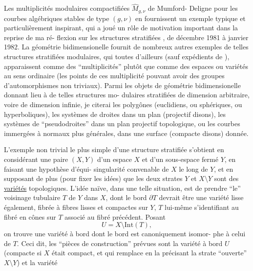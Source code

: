 
Les multiplicités modulaires compactifiées $\hat{M}_{g,\nu}$ de Mumford-%
Deligne pour les courbes algébriques stables de type $(g,\nu)$ en
fournissent un exemple typique et particulièrement inspirant, qui
a joué un rôle de motivation important dans la reprise de ma ré-%
flexion sur les structures stratifiées , de décembre 1981 à janvier
1982. La géométrie bidimensionelle fournit de nombreux autres
exemples de telles structures stratifiées modulaires, qui toutes
d'ailleurs (sauf expédients de ), apparaissent
comme des ``multiplicités'' plutôt que comme des espaces ou variétés
au sens ordinaire (les points de ces multiplicité pouvant avoir
des groupes d'automorphismes non triviaux). Parmi les objets de
géométrie bidimensionelle donnant lieu à de telles structures mo-%
dulaires stratifiées de dimension arbitraire, voire de dimension
infinie, je citerai les polygônes (euclidiens, ou sphériques, ou
hyperboliques), les systèmes de droites dans un plan (projectif
disons), les systèmes de ``pseudodroites'' dans un plan projectif
topologique, ou les courbes immergées à  normaux plus
générales, dans une surface (compacte disons) donnée.

L'exemple non trivial le plus simple d'une structure
stratifiée s'obtient en considérant une paire $(X,Y)$ d'un espace
$X$ et d'un sous-espace fermé $Y$, en faisant une hypothèse d'équi-%
singularité convenable de $X$ le long de $Y$, et en supposant de
plus (pour fixer les idées) que les deux strates $Y$ et $X\setminus Y$ sont
des \uline{variétés} topologiques. L'idée naïve, dans une telle situation,
est de prendre ``le'' voisinage tubulaire $T$ de $Y$ dans $X$, dont
le bord $\partial T$ devrait être une variété lisse également, fibrée à
fibres lisses et compactes sur $Y$, $T$ lui-même s'identifiant au
fibré en cônes sur $T$ associé au fibré précédent. Posant
\[ U = X \setminus \mathrm{Int}(T), \]
on trouve une variété à bord dont le bord est canoniquement isomor-%
phe à celui de $T$. Ceci dit, les ``pièces de construction'' prévues
sont la variété à bord $U$ (compacte si $X$ était compact, et qui
remplace en la précisant la strate ``ouverte'' $X\setminus Y$) et la variété

